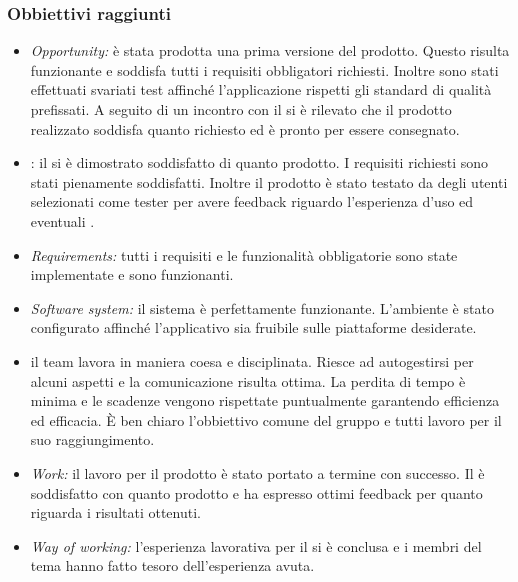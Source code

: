 \subsubsection{Obbiettivi raggiunti}
\begin{itemize}
\item \textit{Opportunity:} è stata prodotta una prima versione del prodotto. Questo risulta funzionante e soddisfa tutti i requisiti obbligatori richiesti. Inoltre sono stati effettuati svariati test affinché l'applicazione rispetti gli standard di qualità prefissati. A seguito di un incontro con il  si è rilevato che il prodotto realizzato soddisfa quanto richiesto ed è pronto per essere consegnato.
\item {}: il  si è dimostrato soddisfatto di quanto prodotto. I requisiti richiesti sono stati pienamente soddisfatti. Inoltre il prodotto è stato testato da degli utenti selezionati come tester per avere feedback riguardo l'esperienza d'uso ed eventuali .
\item \textit{Requirements:} tutti i requisiti e le funzionalità obbligatorie sono state implementate e sono funzionanti.
\item \textit{Software system:} il sistema è perfettamente funzionante. L'ambiente è stato configurato affinché l'applicativo sia fruibile sulle piattaforme desiderate.
\item {} il team lavora in maniera coesa e disciplinata. Riesce ad autogestirsi per alcuni aspetti e la comunicazione risulta ottima. La perdita di tempo è minima e le scadenze vengono rispettate puntualmente garantendo efficienza ed efficacia. \`{E} ben chiaro l'obbiettivo comune del gruppo e tutti lavoro per il suo raggiungimento.
\item \textit{Work:} il lavoro per il prodotto è stato portato a termine con successo. Il  è soddisfatto con quanto prodotto e ha espresso ottimi feedback per quanto riguarda i risultati ottenuti.
\item \textit{Way of working:} l'esperienza lavorativa per il  si è conclusa e i membri del tema hanno fatto tesoro dell'esperienza avuta.
\end{itemize}
